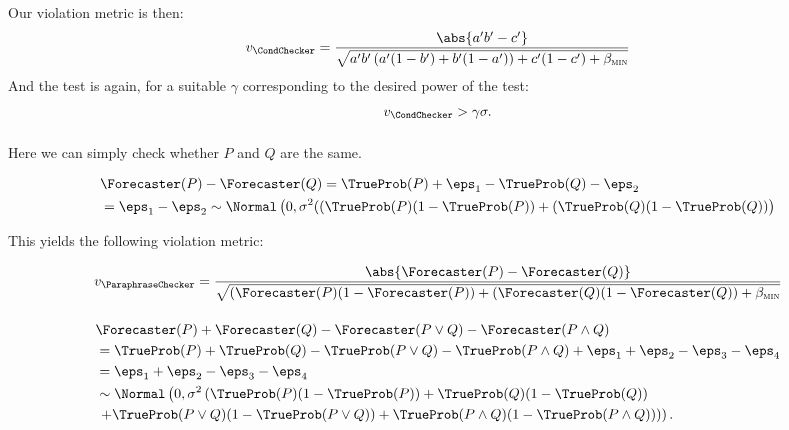 Our violation metric is then:
\begin{align*}
    v_{\CondChecker}
    = \frac{\abs{a'b' - c'}}{
        \sqrt{a'b' \left( a'(1-b') + b'(1-a') \right) + c'(1-c')+ \betamin}
    }
\end{align*}
And the test is again, for a suitable $\gamma$ corresponding to the desired power of the test:
\begin{align*}
    v_{\CondChecker} > \gamma \sigma.
\end{align*}


\paragraph{\ParaphraseChecker}

Here we can simply check whether $P$ and $Q$ are the same.

\begin{align*}
   &\Forecaster(P) - \Forecaster(Q)
   = \TrueProb(P) + \eps_1 - \TrueProb(Q) - \eps_2 \\
   &= \eps_1 - \eps_2 \sim \Normal\left(0, \sigma^2 ((\TrueProb(P)(1 - \TrueProb(P)) + (\TrueProb(Q)(1 - \TrueProb(Q)) \right)
\end{align*}

This yields the following violation metric:

\begin{align*}
    v_{\ParaphraseChecker}
    = \frac{\abs{\Forecaster(P) - \Forecaster(Q)}}{
        \sqrt{(\Forecaster(P)(1 - \Forecaster(P)) + (\Forecaster(Q)(1 - \Forecaster(Q))+ \betamin}
    }
\end{align*}

\paragraph{\AndOrChecker}

\begin{align*}
   &\Forecaster(P) + \Forecaster(Q) - \Forecaster(P \lor Q) - \Forecaster(P \land Q) \\
   & =
   \TrueProb(P) + \TrueProb(Q) - \TrueProb(P \lor Q) - \TrueProb(P \land Q) + \eps_1 + \eps_2 - \eps_3 - \eps_4 \\
   &= \eps_1 + \eps_2 - \eps_3 - \eps_4 \\
   &\sim \Normal\left(0, \sigma^2 \left( \TrueProb(P)(1 - \TrueProb(P)) + \TrueProb(Q)(1 - \TrueProb(Q)) \right. \right. \\
   &\left. \left. + \TrueProb(P \lor Q)(1 - \TrueProb(P \lor Q)) + \TrueProb(P \land Q)(1 - \TrueProb(P \land Q)) \right) \right).
\end{align*}



